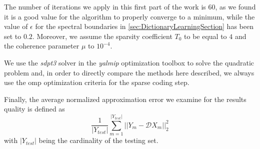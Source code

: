 The number of iterations we apply in this first part of the work is $60$, as we found it is a good value for the algorithm to properly converge to a minimum, while the value of $\epsilon$ for the spectral boundaries in \ref{sec:DictionaryLearningSection} has been set to $0.2$. Moreover, we assume the sparsity coefficient $T_0$ to be equal to $4$ and the coherence parameter $\mu$ to $10^{-4}$.

We use the \textit{sdpt3} solver in the \textit{yalmip} optimization toolbox to solve the quadratic problem and, in order to directly compare the methods here described, we always use the \gls{omp} optimization criteria for the sparse coding step.

Finally, the average normalized approximation error we examine for the results quality is defined as 
\begin{equation}
\frac{1}{|Y_{test}|}\sum_{m=1}^{|Y_{test}|}||Y_m - \mathcal{D}X_m||_2^2
\end{equation}
with $|Y_{test}|$ being the cardinality of the testing set.
